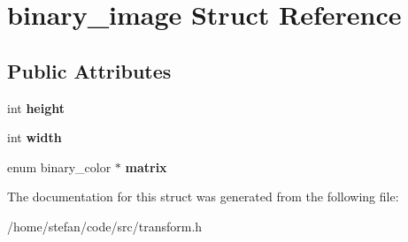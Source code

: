 \hypertarget{structbinary__image}{}\section{binary\+\_\+image Struct Reference}
\label{structbinary__image}
\subsection*{Public Attributes}
\begin{DoxyCompactItemize}
\item 
\mbox{\label{structbinary__image_add7b8fedbca88f52030475d1257fad8c}} 
int {\bfseries height}
\item 
\mbox{\label{structbinary__image_ab43306f2a3a22e9f9d6b43d2227b2019}} 
int {\bfseries width}
\item 
\mbox{\label{structbinary__image_a78c7dd6c5db3d6f18e3b8a3c18aff0ba}} 
enum binary\+\_\+color $\ast$ {\bfseries matrix}
\end{DoxyCompactItemize}


The documentation for this struct was generated from the following file\+:\begin{DoxyCompactItemize}
\item 
/home/stefan/code/src/transform.\+h\end{DoxyCompactItemize}
